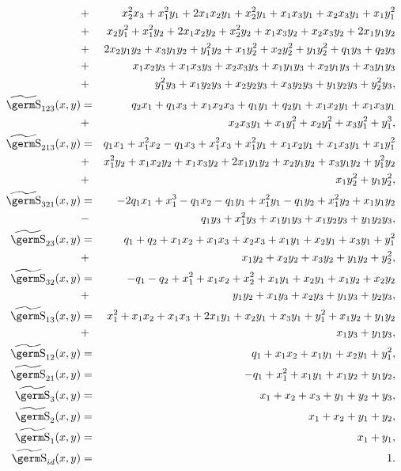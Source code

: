 {{\begin{eqnarray*}
 &+ & x_2^2 x_3 + x_1^2 y_1 + 
 2 x_1 x_2 y_1 + x_2^2 y_1 + x_1 x_3 y_1 + x_2 x_3 y_1 + 
 x_1 y_1^2\\ 
 &+ & x_2 y_1^2 + 
 x_1^2 y_2 + 2 x_1 x_2 y_2 + x_2^2 y_2 + x_1 x_3 y_2 + 
  x_2 x_3 y_2 + 2 x_1 y_1 y_2\\ 
 &+ &  2 x_2 y_1 y_2 + x_3 y_1 y_2 +y_1^2 y_2 + x_1 y_2^2 + 
  x_2 y_2^2 + y_1 y_2^2 + q_1 y_3 + q_2 y_3 \\ 
 &+ &  x_1 x_2 y_3 + 
  x_1 x_3 y_3 + x_2 x_3 y_3 + 
  x_1 y_1 y_3 + x_2 y_1 y_3 + 
  x_3 y_1 y_3 \\ 
 &+ & y_1^2 y_3 + 
  x_1 y_2 y_3 + x_2 y_2 y_3 + 
  x_3 y_2 y_3 + y_1 y_2 y_3 + 
  y_2^2 y_3, \\ 
\wt{\s}_{123}(x,y) & = & q_2 x_1 +  q_1 x_3 + x_1 x_2 x_3 + 
  q_1 y_1 + q_2 y_1 +  x_1 x_2 y_1 +x_1 x_3 y_1 \\ 
 &+ & x_2 x_3 y_1 + 
   x_1 y_1^2 + x_2 y_1^2 + 
  x_3 y_1^2 + y_1^3, \\ 
\wt{\s}_{213}(x,y) & = & q_1 x_1 + x_1^2 x_2 - q_1 x_3 + 
  x_1^2 x_3 + x_1^2 y_1 + 
  x_1 x_2 y_1 +x_1 x_3 y_1 + 
  x_1 y_1^2 \\ 
 &+ & x_1^2 y_2 + 
  x_1 x_2 y_2 + x_1 x_3 y_2 + 
  2 x_1 y_1 y_2 +x_2 y_1 y_2 + 
   x_3 y_1 y_2 + y_1^2 y_2 \\ 
 &+ & x_1 y_2^2 +  y_1 y_2^2, \\ 
\wt{\s}_{321}(x,y) & = & -2 q_1 x_1 + x_1^3 - q_1 x_2 - 
  q_1 y_1 + x_1^2 y_1 - q_1 y_2 +x_1^2 y_2 + x_1 y_1 y_2 \\ 
 &- &  q_1 y_3 + x_1^2 y_3 + 
  x_1 y_1 y_3 + x_1 y_2 y_3 + y_1 y_2 y_3, \\ 
\wt{\s}_{23}(x,y) & = & q_1 + q_2 + x_1 x_2 + x_1 x_3 + 
  x_2 x_3 +  x_1 y_1 + x_2 y_1 +x_3 y_1 + y_1^2 \\ 
 &+ & x_1 y_2 + 
  x_2 y_2 + x_3 y_2 + y_1 y_2 + 
  y_2^2, \\ 
\wt{\s}_{32}(x,y) & = & - q_1 - q_2 + x_1^2 + 
x_1 x_2 + x_2^2 + 
x_1 y_1 + x_2 y_1 + x_1 y_2 + 
  x_2 y_2 \\ 
 &+ & y_1 y_2 + x_1 y_3 + 
  x_2 y_3 + y_1 y_3 + y_2 y_3, \\ 
\wt{\s}_{13}(x,y) & = &  x_1^2 + x_1 x_2 + x_1 x_3 + 
  2 x_1 y_1 + x_2 y_1 + x_3 y_1 + y_1^2 + x_1 y_2  + y_1 y_2\\ 
 &+ &   x_1 y_3 + y_1 y_3, \\ 
\wt{\s}_{12}(x,y) & = &  q_1 + x_1 x_2 + x_1 y_1 + x_2 y_1 + 
  y_1^2, \\ 
\wt{\s}_{21}(x,y) & = & - q_1 + x_1^2 + x_1 y_1 + x_1 y_2 + 
  y_1 y_2, \\ 
\wt{\s}_{3}(x,y) & = & x_1 + x_2 + x_3 + y_1 + y_2 + y_3, \\ 
\wt{\s}_{2}(x,y) & = & x_1 + x_2 + y_1 + y_2, \\ 
\wt{\s}_{1}(x,y) & = & x_1 + y_1, \\ 
\wt{\s}_{id}(x,y) & = & 1.
\end{eqnarray*} 

}}

